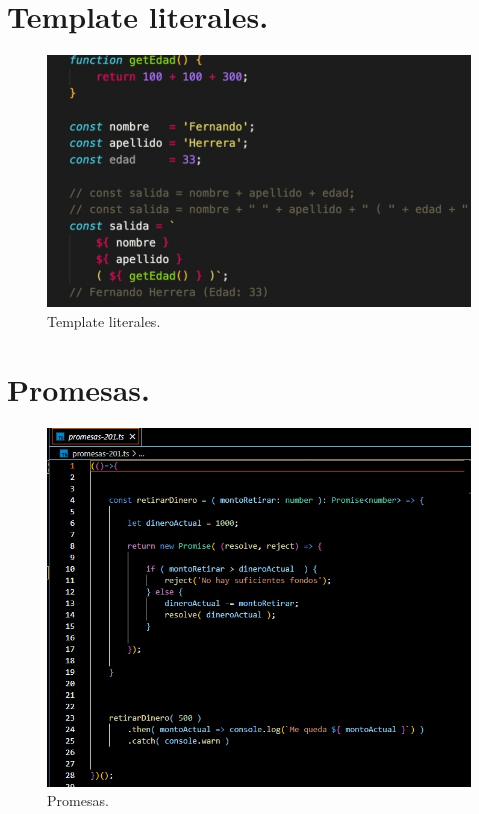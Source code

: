 \section{Template literales.}
\begin{figure}[H] 
	\centering
	\includegraphics[scale=0.6]{images/c2_5.jpg}
	\caption{Template literales.}
\end{figure}

\section{Promesas.}
\begin{figure}[H] 
	\centering
	\includegraphics[scale=0.8]{images/c2_5_1.jpg}
	\caption{Promesas.}
	
\end{figure}

